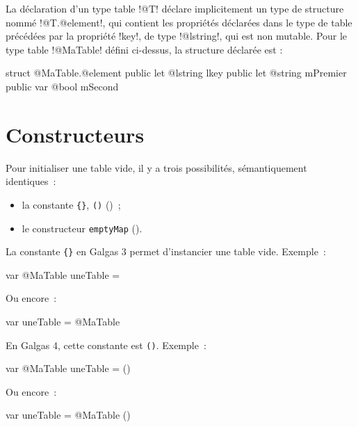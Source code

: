 La déclaration d'un type table \ggsq!@T! déclare implicitement un type de structure nommé \ggsq!@T.@element!, qui contient les propriétés déclarées dans le type de table précédées par la propriété \ggsq!key!, de type \ggsq!@lstring!, qui est non mutable. Pour le type table \ggsq!@MaTable! défini ci-dessus, la structure déclarée est :

\begin{galgas4}
struct @MaTable.@element {
  public let @lstring lkey
  public let @string mPremier
  public var @bool mSecond
}
\end{galgas4}





\section{Constructeurs}

Pour initialiser une table vide, il y a trois possibilités, sémantiquement identiques~:
\begin{itemize}
  \item la constante \texttt{\{\}}, \texttt{()} ()~;
  \item le constructeur \texttt{emptyMap} ().
\end{itemize}



La constante \texttt{\{\}} en Galgas 3 permet d'instancier une table vide. Exemple~:
\begin{galgas4}
var @MaTable uneTable = {}
\end{galgas4}

Ou encore~:

\begin{galgas4}
var uneTable = @MaTable {}
\end{galgas4}

En Galgas 4, cette constante est \texttt{()}. Exemple~:
\begin{galgas4}
var @MaTable uneTable = ()
\end{galgas4}

Ou encore~:

\begin{galgas4}
var uneTable = @MaTable ()
\end{galgas4}





